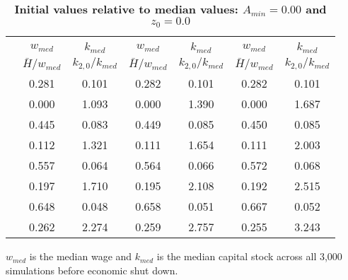 \documentclass[letterpaper,12pt]{article}
\theoremstyle{definition}
\begin{document}
\begin{spacing}{1.5}
  \begin{table}[htbp]\centering\captionsetup{width=5.3in}
  \caption{\label{TabInitVal_A0}\textbf{Initial values relative to median values: $A_{min}=0.00$ and $z_0=0.0$}}
    \begin{threeparttable}
    \begin{tabular}{>{\small}c| >{\small}c >{\small}c| >{\small}c >{\small}c| >{\small}c >{\small}c}
      \hline\hline
      & \multicolumn{2}{c}{$k_{2,0}=0.11$} & \multicolumn{2}{c}{$k_{2,0}=0.14$} & \multicolumn{2}{c}{$k_{2,0}=0.17$} \\ \cline{2-7}
      & $w_{med}$ & $k_{med}$ & $w_{med}$ & $k_{med}$ & $w_{med}$ & $k_{med}$ \\
      & $\bar{H}/w_{med}$ & $k_{2,0}/k_{med}$ & $\bar{H}/w_{med}$ & $k_{2,0}/k_{med}$ & $\bar{H}/w_{med}$ & $k_{2,0}/k_{med}$ \\
      \hline
      \multirow{2}{*}{$\bar{H}=0.00$}
      & 0.281 & 0.101 & 0.282 & 0.101 & 0.282 & 0.101 \\
      & 0.000 & 1.093 & 0.000 & 1.390 & 0.000 & 1.687 \\
      \hline
      \multirow{2}{*}{$\bar{H}=0.05$}
      & 0.445 & 0.083 & 0.449 & 0.085 & 0.450 & 0.085 \\
      & 0.112 & 1.321 & 0.111 & 1.654 & 0.111 & 2.003 \\
      \hline
      \multirow{2}{*}{$\bar{H}=0.11$}
      & 0.557 & 0.064 & 0.564 & 0.066 & 0.572 & 0.068 \\
      & 0.197 & 1.710 & 0.195 & 2.108 & 0.192 & 2.515 \\
      \hline
      \multirow{2}{*}{$\bar{H}=0.17$}
      & 0.648 & 0.048 & 0.658 & 0.051 & 0.667 & 0.052 \\
      & 0.262 & 2.274 & 0.259 & 2.757 & 0.255 & 3.243 \\
      \hline\hline
    \end{tabular}
    \begin{tablenotes}
      \scriptsize{\item[]$w_{med}$ is the median wage and $k_{med}$ is the median capital stock across all 3,000 simulations before economic shut down.}
    \end{tablenotes}
    \end{threeparttable}
  \end{table}


\end{spacing}
\end{document}
